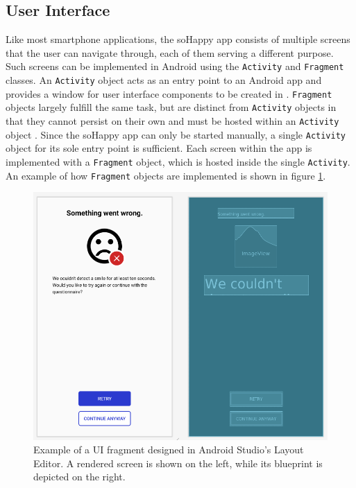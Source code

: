 \subsection{User Interface} \label{sec:user_interface}
Like most smartphone applications, the soHappy app consists of multiple screens that the user can navigate through, each of them serving a different purpose. Such screens can be implemented in Android using the \texttt{Activity} and \texttt{Fragment} classes. An \texttt{Activity} object acts as an entry point to an Android app and provides a window for user interface components to be created in \cite{intro_to_activities}. \texttt{Fragment} objects largely fulfill the same task, but are distinct from \texttt{Activity} objects in that they cannot persist on their own and must be hosted within an \texttt{Activity} object \cite{intro_to_fragments}. Since the soHappy app can only be started manually, a single \texttt{Activity} object for its sole entry point is sufficient. Each screen within the app is implemented with a \texttt{Fragment} object, which is hosted inside the single \texttt{Activity}. An example of how \texttt{Fragment} objects are implemented is shown in figure \ref{fig:user_interface}.

\begin{figure}
  \includegraphics[width=\linewidth]{figures/user_interface.png}
  \caption{Example of a UI fragment designed in Android Studio's Layout Editor. A rendered screen is shown on the left, while its blueprint is depicted on the right.}
  \label{fig:user_interface}
\end{figure}

